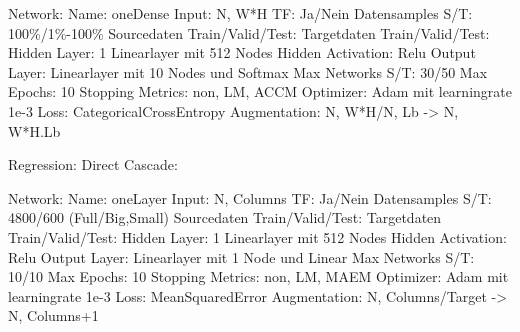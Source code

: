 Network:
Name: oneDense
Input: N, W*H
TF: Ja/Nein
Datensamples S/T: 100\%/1\%-100\%
Sourcedaten Train/Valid/Test: 
Targetdaten Train/Valid/Test: 
Hidden Layer: 1 Linearlayer mit 512 Nodes
Hidden Activation: Relu
Output Layer: Linearlayer mit 10 Nodes und Softmax
Max Networks S/T: 30/50
Max Epochs: 10
Stopping Metrics: non, LM, ACCM
Optimizer: Adam mit learningrate 1e-3
Loss: CategoricalCrossEntropy
Augmentation: N, W*H/N, Lb -> N, W*H.Lb



Regression:
Direct Cascade:

Network: 
Name: oneLayer
Input: N, Columns
TF: Ja/Nein
Datensamples S/T: 4800/600 (Full/Big,Small)
Sourcedaten Train/Valid/Test: 
Targetdaten Train/Valid/Test: 
Hidden Layer: 1 Linearlayer mit 512 Nodes
Hidden Activation: Relu
Output Layer: Linearlayer mit 1 Node und Linear
Max Networks S/T: 10/10
Max Epochs: 10
Stopping Metrics: non, LM, MAEM
Optimizer: Adam mit learningrate 1e-3
Loss: MeanSquaredError
Augmentation: N, Columns/Target -> N, Columns+1
\fi

